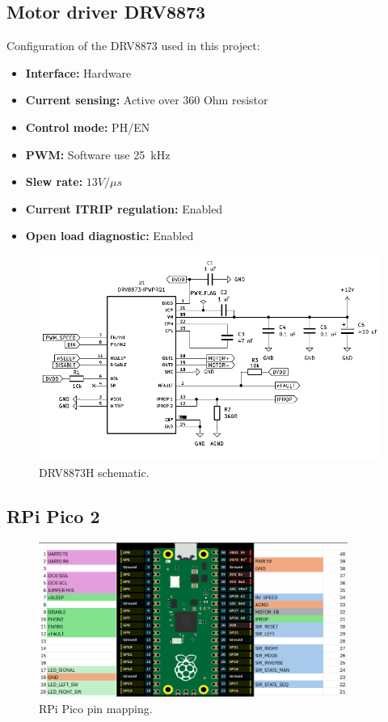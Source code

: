 \newpage
\subsection{Motor driver DRV8873}
Configuration of the DRV8873 used in this project:

\begin{itemize}
    \item \textbf{Interface:} Hardware
    \item \textbf{Current sensing:} Active over 360 Ohm resistor
    \item \textbf{Control mode:} PH/EN
    \item \textbf{PWM:} Software use 25~kHz
    \item \textbf{Slew rate:} \(13 V/ \mu s \)
    \item \textbf{Current ITRIP regulation:} Enabled
    \item \textbf{Open load diagnostic:} Enabled
\end{itemize}


\begin{figure}[h!]
    \centering
    \includegraphics[width=\textwidth]{images/DRV8873H_wiring.pdf}
    \caption{DRV8873H schematic.}
    \label{fig:DRV8873H_wiring}
\end{figure}

\newpage
\subsection{RPi Pico 2}

\begin{figure}[h!]
    \centering
    \includegraphics[width=0.9\textwidth]{images/pico_pin_mapping.png}
    \caption{RPi Pico pin mapping.}
    \label{fig:pico_pin_mapping}
\end{figure}

